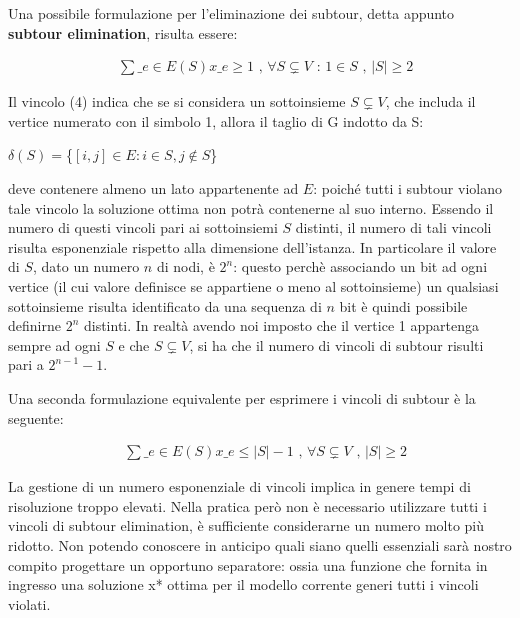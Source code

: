\documentclass[11pt]{article}
\begin{document}
\vspace{2\baselineskip}

Una possibile formulazione per l'eliminazione dei subtour, detta appunto \textbf{subtour elimination}, risulta essere:

\begin{eqnarray}
&\displaystyle{\sum\_{e \in E(S)}x\_e \geq 1} \text{ , } \forall S \subsetneq V \text{ : } 1 \in S \text{ , } |S| \geq 2
\end{eqnarray}


Il vincolo (4) indica che se si considera un sottoinsieme $S \subsetneq V$, che includa il vertice numerato con il simbolo 1, allora il taglio di G indotto da S:

\begin{center}
$\delta(S) = $\{$ {[i,j]\in E : i \in S, j \notin S} $\} $ $
\end{center}

deve contenere almeno un lato appartenente ad $E$: poich\'e tutti i subtour violano tale vincolo la soluzione ottima non potr\`a contenerne al suo interno.  
Essendo il numero di questi vincoli pari ai sottoinsiemi $S$ distinti, il numero di tali vincoli risulta esponenziale rispetto alla dimensione dell'istanza. In particolare il valore di $S$, dato un numero $n$ di nodi, \`e $2^n$: questo perch\`e associando un bit ad ogni vertice (il cui valore definisce se appartiene o meno al sottoinsieme) un qualsiasi sottoinsieme risulta identificato da una sequenza di $n$ bit è quindi possibile definirne $2^n$ distinti. In realtà avendo noi imposto che il vertice 1 appartenga sempre ad ogni $S$ e che $S \subsetneq V$, si ha che il numero di vincoli di subtour risulti pari a  $2^{n-1} - 1$.

Una seconda formulazione equivalente per esprimere i vincoli di subtour \`e la seguente:

\begin{eqnarray}
&\displaystyle{\sum\_{e \in E(S)}x\_e \leq |S| - 1} \text{ , } \forall S \subsetneq V \text{ , } |S| \geq 2
\end{eqnarray}

La gestione di un numero esponenziale di vincoli implica in genere tempi di risoluzione troppo elevati. Nella pratica però non è necessario utilizzare tutti i vincoli di subtour elimination, è sufficiente considerarne un numero molto più ridotto. Non potendo conoscere in anticipo quali siano quelli essenziali sarà nostro compito progettare un opportuno separatore: ossia una funzione che fornita in ingresso una soluzione x* ottima per il modello corrente generi tutti i vincoli violati.
\end{document}
